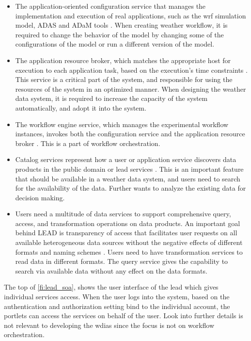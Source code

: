 \begin{itemize}
\item The application-oriented configuration service that manages the implementation and execution of real applications, such as the \acrshort{wrf} simulation model, ADAS and ADaM tools \cite{Droegemeier2005Service-OrientedWeather}. When creating weather workflow, it is required to change the behavior of the model by changing some of the configurations of the model or run a different version of the model.
\item The application resource broker, which matches the appropriate host for execution to each application task, based on the execution’s time constraints \cite{Droegemeier2005Service-OrientedWeather}. This service is a critical part of the system, and responsible for using the resources of the system in an optimized manner. When designing the weather data system, it is required to increase the capacity of the system automatically, and adopt it into the system.
\item The workflow engine service, which manages the experimental workflow instances, invokes both the configuration service and the application resource broker \cite{Droegemeier2005Service-OrientedWeather}. This is a part of workflow orchestration.
\item Catalog services represent how a user or application service discovers data products in the public domain or \acrshort{lead} services \cite{Droegemeier2005Service-OrientedWeather}. This is an important feature that should be available in a weather data system, and users need to search for the availability of the data. Further wants to analyze the existing data for decision making.
\item Users need a multitude of data services to support comprehensive query, access, and transformation operations on data products. An important goal behind LEAD is transparency of access that facilitates user requests on all available heterogeneous data sources without the negative effects of different formats and naming schemes \cite{Droegemeier2005Service-OrientedWeather}. Users need to have transformation services to read data in different formats. The query service gives the capability to search via available data without any effect on the data formats.
\end{itemize}
The top of \cref{fi:lead_soa}, shows the user interface of the \acrshort{lead} which gives individual services access. When the user logs into the system, based on the authentication and authorization setting bind to the individual account, the portlets can access the services on behalf of the user. Look into further details is not relevant to developing the \acrshort{wdias} since the focus is not on workflow orchestration.

